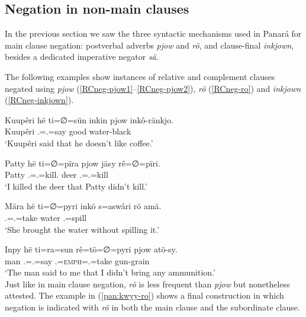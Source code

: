 \documentclass[output=paper,colorlinks,citecolor=brown,draft]{langscibook}
\begin{document}
\subsection{Negation in non-main clauses}\label{pan:sec:non-main}

 In the previous section we saw the three syntactic mechanisms used in Panará for main clause negation: postverbal adverbs \textit{pjow} and \textit{rö}, and clause-final \textit{inkjown}, besides a dedicated imperative negator \textit{sä}.

The following examples show instances of relative and complement clauses negated using \textit{pjow} (\ref{RCneg-pjow1}--\ref{RCneg-pjow2}), \textit{rö} (\ref{RCneg-ro}) and \textit{inkjown} (\ref{RCneg-inkjown}).

\ea\label{RCneg-pjow1}
    \gll Kuupêri hë ti=∅=sün inkin pjow inkô-ränkjo. \\
    Kuupêri \Erg{} \Tsg.\Erg{}=\Tsg.\Abs{}=say good \Neg{} water-black  \\
    \glt `Kuupêri said that he doesn't like coffee.' \\
\z

\ea\label{RCneg-pjow2}
    \gll Patty hë ti=∅=pïra pjow jäsy rê=∅=pïri. \\
    Patty \Erg{} \Tsg.\Erg{}=\Tsg.\Abs{}=kill.\Rel{} \Neg{} deer \Fsg.\Erg{}=\Tsg.\Abs{}=kill   \\
    \glt `I killed the deer that Patty didn't kill.' \\
\z

\ea\label{RCneg-ro}
    \gll Mära hë ti=∅=pyri inkö s=aswâri rö amä. \\
    \Tsg{} \Erg{} \Tsg.\Erg{}=\Tsg.\Abs{}=take water \Tsg.\Abs{}=spill \Neg{} \Ine{} \\
    \glt `She brought the water without spilling it.' \\
\z

\ea\label{RCneg-inkjown}
    \gll Inpy hë ti=ra=sun rê=tö=∅=pyri pjow atö-sy. \\
    man \Erg{} \Tsg.\Erg{}=\Fsg.\Abs{}=say \Fsg.\Erg{}=\textsc{emph}=\Tsg.\Abs{}=take \Neg{} gun-grain \\
    \glt `The man said to me that I didn't bring any ammunition.' \\ %
\z
Just like in main clause negation, \textit{rö} is less frequent than \textit{pjow} but nonetheless attested. The example in (\ref{pan:kwyy-ro}) shows a final construction in which negation is indicated with \textit{rö} in both the main clause and the subordinate clause.
\end{document}
